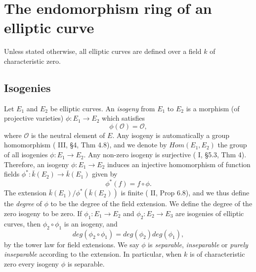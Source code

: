 \newpage
\section{The endomorphism ring of an elliptic curve}
\label{sec:endomorphism-ring-of-an-elliptic-curve}

Unless stated otherwise, all elliptic curves are defined over a field $k$ of
characteristic zero.

\subsection{Isogenies}
\label{sec:isogenies}

Let $E_{1}$ and $E_{2}$ be elliptic curves.  An \emph{isogeny} from $E_{1}$ to
$E_{2}$ is a morphism (of projective varieties) $\phi \colon E_{1} \rightarrow E_{2}$
which satisfies
\begin{equation*}
  \phi \left( \mathcal{O} \right) = \mathcal{O},
\end{equation*}
where $\mathcal{O}$ is the neutral element of $E$.
Any isogeny is automatically a group homomorphism (\cite{silverman86} III, \S 4, Thm
4.8), and we denote by $Hom(E_{1},E_{2})$ the group of all isogenies $\phi : E_{1}
\rightarrow E_{2}$.  Any non-zero isogeny is surjective (\cite{shafarevich94} I, \S 5.3,
Thm 4).  Therefore, an isogeny $\phi \colon E_{1} \rightarrow E_{2}$ induces an
injective homomorphism of function fields $\phi^{*} \colon \bar{k}\left(E_{2}\right)
\rightarrow \bar{k}\left(E_{1}\right)$ given by
\begin{equation*}
  \phi^{*}\left(f\right) = f \circ \phi.
\end{equation*}
The extension $\bar{k}\left(E_{1}\right) /
\phi^{*}\left(\bar{k}\left(E_{2}\right)\right)$ is finite (\cite{hartshorne77} II,
Prop 6.8), and we thus define the \emph{degree} of $\phi$ to be the degree of the
field extension.  We define the degree of the zero isogeny to be zero.  If $\phi_{1}
\colon E_{1} \rightarrow E_{2}$ and $\phi_{2} \colon E_{2} \rightarrow E_{3}$ are
isogenies of elliptic curves, then $\phi_{2} \circ \phi_{1}$ is an isogeny, and
\begin{equation}
  \label{eq:degree-of-composition}
  deg \left( \phi_{2} \circ \phi_{1} \right) = deg \left( \phi_{2} \right) deg \left( \phi_{1} \right),
\end{equation}
by the tower law for field extensions.
We say $\phi$ is \emph{separable}, \emph{inseparable} or \emph{purely inseparable}
according to the extension.  In particular, when $k$ is of characteristic zero every
isogeny $\phi$ is separable.

